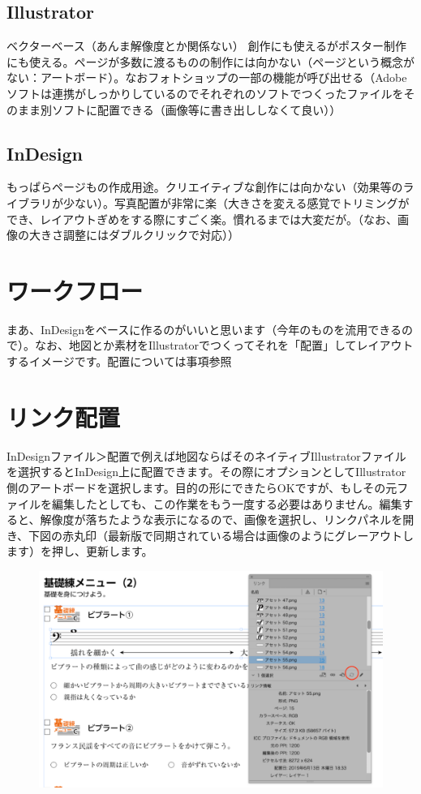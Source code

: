 \documentclass[dvipdfmx,jb5]{jreport}
\begin{document}
\subsection{Illustrator}
ベクターベース（あんま解像度とか関係ない）
創作にも使えるがポスター制作にも使える。ページが多数に渡るものの制作には向かない（ページという概念がない：アートボード）。なおフォトショップの一部の機能が呼び出せる（Adobeソフトは連携がしっかりしているのでそれぞれのソフトでつくったファイルをそのまま別ソフトに配置できる（画像等に書き出ししなくて良い））
\subsection{InDesign}
もっぱらページもの作成用途。クリエイティブな創作には向かない（効果等のライブラリが少ない）。写真配置が非常に楽（大きさを変える感覚でトリミングができ、レイアウトぎめをする際にすごく楽。慣れるまでは大変だが。（なお、画像の大きさ調整にはダブルクリックで対応））

\section{ワークフロー}
まあ、InDesignをベースに作るのがいいと思います（今年のものを流用できるので）。なお、地図とか素材をIllustratorでつくってそれを「配置」してレイアウトするイメージです。配置については事項参照

\section{リンク配置}
InDesignファイル＞配置で例えば地図ならばそのネイティブIllustratorファイルを選択するとInDesign上に配置できます。その際にオプションとしてIllustrator側のアートボードを選択します。目的の形にできたらOKですが、もしその元ファイルを編集したとしても、この作業をもう一度する必要はありません。編集すると、解像度が落ちたような表示になるので、画像を選択し、リンクパネルを開き、下図の赤丸印（最新版で同期されている場合は画像のようにグレーアウトします）を押し、更新します。

\begin{figure}[H]
      \includegraphics[scale=0.7]{assets/pmh0.png}
\end{figure}
\end{document}
